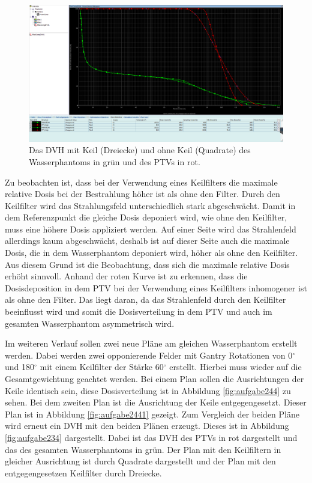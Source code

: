 \begin{figure}[H]
	\centering
	\includegraphics[width=0.7\linewidth]{../../Wasserphantom Bilder/Aufgabe233.png}
	\caption{Das DVH mit Keil (Dreiecke) und ohne Keil (Quadrate) des Wasserphantoms in grün und des PTVs in rot.}
	\label{fig:aufgabe233}
\end{figure}

Zu beobachten ist, dass bei der Verwendung eines Keilfilters die maximale
relative Dosis bei der Bestrahlung höher ist als ohne den Filter.
Durch den Keilfilter wird das Strahlungsfeld unterschiedlich
stark abgeschwächt.
Damit in dem Referenzpunkt die gleiche Dosis deponiert wird, wie ohne den Keilfilter, muss eine höhere Dosis appliziert werden.
Auf einer Seite wird das Strahlenfeld allerdings kaum abgeschwächt, deshalb ist auf dieser Seite auch die maximale Dosis, die in dem
Wasserphantom deponiert wird, höher als ohne den Keilfilter. Aus diesem Grund ist die Beobachtung, dass sich die maximale relative Dosis
erhöht sinnvoll.
Anhand
der roten Kurve ist zu erkennen, dass die Dosisdeposition in dem PTV bei der
Verwendung eines Keilfilters inhomogener ist als ohne den Filter. Das
liegt daran, da das Strahlenfeld durch den Keilfilter beeinflusst wird und somit
die Dosisverteilung in dem PTV und auch im gesamten Wasserphantom asymmetrisch
wird.

Im weiteren Verlauf sollen zwei neue Pläne am gleichen Wasserphantom erstellt werden.
Dabei werden zwei opponierende Felder mit Gantry Rotationen von 0$^\circ$ und 180$^\circ$ mit einem Keilfilter der Stärke 60$^\circ$ erstellt. Hierbei muss wieder auf die Gesamtgewichtung geachtet werden. Bei einem Plan sollen die Ausrichtungen der Keile
identisch sein, diese Dosisverteilung ist in Abbildung \ref{fig:aufgabe244} zu sehen.
Bei dem zweiten Plan ist die Ausrichtung der Keile entgegengesetzt. Dieser Plan ist in
Abbildung \ref{fig:aufgabe2441} gezeigt.
Zum Vergleich der beiden Pläne wird erneut ein DVH mit den beiden Plänen erzeugt.
Dieses ist in Abbildung \ref{fig:aufgabe234} dargestellt. Dabei ist das DVH des PTVs
in rot dargestellt und das des gesamten Wasserphantoms in grün. Der Plan
mit den Keilfiltern in gleicher Ausrichtung ist durch Quadrate dargestellt und
der Plan mit den entgegengesetzen Keilfilter durch Dreiecke.

